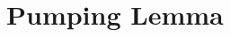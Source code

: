 \begin{itemize}
    \begin{comment}
    \item While Grammatik
    \begin{align*}
\text{\textsl{while-programm}}&\to{\color{red}\text{\textsl{anweisungsfolge}}}\\
&\to\varepsilon\\
\text{\textsl{anweisungsfolge}}
&\to{\color{blue}\text{\textsl{anweisungsfolge}}\;\text{'{\tt ;}'}\;
\text{\textsl{anweisung}}}
\\
\text{\textsl{anweisung}}
&\to\text{\color{red}\textsl{zuweisung}}
\\
&\to\text{\color{red}\textsl{loop-anweisung}}
\\
\text{\textsl{zuweisung}}
&\to
{\color{blue}
\text{\textsl{variable}}\; \text{'{\tt :}'}\, \text{'{\tt =}'}\;
\textsl{variable}\;\text{\textsl{operator}}\;\text{\textsl{konstante}}}
\\
\text{\textsl{operator}}
&\to\text{'{\tt +}'}\;|\;\text{'{\tt -}'}
\\
\text{\textsl{konstante}}&\to\text{\color{red}\textsl{ziffer}}\\
&\to\text{\textsl{konstante}}\;\text{\textsl{ziffer}}
\\
\text{\textsl{ziffer}}&\to 
\text{'{\tt 0}'}\;|\;
\text{'{\tt 1}'}\;|\;
\text{'{\tt 2}'}\;|\;
\text{'{\tt 3}'}\;|\;
\text{'{\tt 4}'}\;|\;
\text{'{\tt 5}'}\;|\;
\text{'{\tt 6}'}\;|\;
\text{'{\tt 7}'}\;|\;
\text{'{\tt 8}'}\;|\;
\text{'{\tt 9}'}\\
\text{\textsl{variable}}&\to{\color{yellow} \text{'{\tt x}'}\;\text{\textsl{konstante}}}\\
\text{\textsl{while-anweisung}}&\to{\color{blue}
\text{\textsl{while}}\;
\text{\textsl{variable}}\;
\text{'{\tt >}'}\;
\text{'{\tt 0}'}\;
\text{\textsl{do}}\;
\text{\textsl{anweisungsfolge}}\;
\text{\textsl{end}}}\\
\text{\textsl{while}}&\to
{\color{green}\text{'{\tt W}'}\; \text{'{\tt H}'}\; \text{'{\tt I}'}\; \text{'{\tt L}'}\; \text{'{\tt E}'}}\\
\text{\textsl{end}}&\to{\color{green} \text{'{\tt E}'}\; \text{'{\tt N}'}\; \text{'{\tt D}'}}\\
\text{\textsl{do}}&\to{\color{green} \text{'{\tt D}'}\; \text{'{\tt O}'}} \\
\end{align*}
\end{comment}
    \end{itemize}
\section*{Pumping Lemma}
